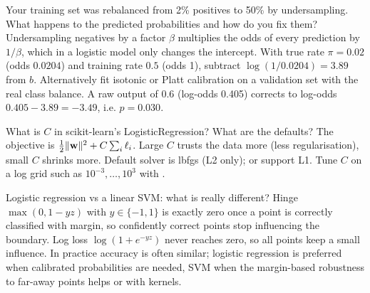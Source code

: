 \begin{qa}{\deep Your training set was rebalanced from 2\% positives to 50\% by undersampling. What happens to the
predicted probabilities and how do you fix them?}
\why Undersampling negatives by a factor $\beta$ multiplies the odds of every prediction by $1/\beta$, which in a
logistic model only changes the intercept. With true rate $\pi = 0.02$ (odds $0.0204$) and training rate $0.5$ (odds 1),
subtract $\log(1/0.0204) = 3.89$ from $b$. Alternatively fit isotonic or Platt calibration on a validation set with the
real class balance.
\worked A raw output of $0.6$ (log-odds 0.405) corrects to log-odds $0.405 - 3.89 = -3.49$, i.e. $p = 0.030$.
\end{qa}

\begin{qa}{What is $C$ in scikit-learn's LogisticRegression? What are the defaults?}
\why The objective is $\frac12\lVert \mathbf w\rVert^2 + C\sum_i \ell_i$. Large $C$ trusts the data more (less regularisation),
small $C$ shrinks more. Default solver is lbfgs (L2 only);  or  support L1. Tune $C$ on a log
grid such as $10^{-3},\dots,10^{3}$ with .
\end{qa}

\begin{qa}{\deep Logistic regression vs a linear SVM: what is really different?}
\why Hinge $\max(0, 1 - yz)$ with $y\in\{-1,1\}$ is exactly zero once a point is correctly classified with margin, so
confidently correct points stop influencing the boundary. Log loss $\log(1+e^{-yz})$ never reaches zero, so all points
keep a small influence. In practice accuracy is often similar; logistic regression is preferred when calibrated
probabilities are needed, SVM when the margin-based robustness to far-away points helps or with kernels.
\end{qa}

